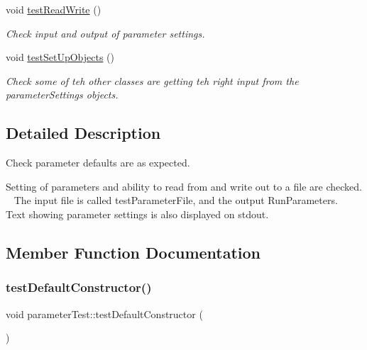 \begin{DoxyCompactItemize}
void \mbox{\hyperlink{classparameterTest_a73ffa897b723095fdb3f06cc309575d6}{test\+Read\+Write}} ()
\begin{DoxyCompactList}\small\item\em Check input and output of parameter settings. \end{DoxyCompactList}\item 
void \mbox{\hyperlink{classparameterTest_aeb4d3a1620defdc974a9b925f4c1cd9f}{test\+Set\+Up\+Objects}} ()
\begin{DoxyCompactList}\small\item\em Check some of teh other classes are getting teh right input from the parameter\+Settings objects. \end{DoxyCompactList}\end{DoxyCompactItemize}


\subsection{Detailed Description}
Check parameter defaults are as expected. 

Setting of parameters and ability to read from and write out to a file are checked. ~\newline
The input file is called test\+Parameter\+File, and the output Run\+Parameters.~\newline
Text showing parameter settings is also displayed on stdout. 

\subsection{Member Function Documentation}
\mbox{\label{classparameterTest_a80bc49c4dafb3b6ae5c7e561b5711583}} 
\subsubsection{\texorpdfstring{test\+Default\+Constructor()}{testDefaultConstructor()}}
{\footnotesize\ttfamily void parameter\+Test\+::test\+Default\+Constructor (\begin{DoxyParamCaption}{ }\end{DoxyParamCaption})\hspace{0.3cm}{\ttfamily [inline]}}



